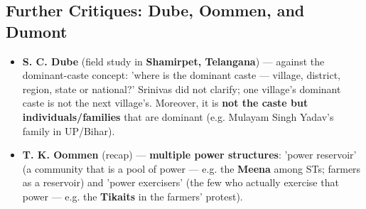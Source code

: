 \subsection{Further Critiques: Dube, Oommen, and Dumont}

\begin{CriticalPoint}
\begin{itemize}
\item \textbf{S. C. Dube} (field study in \textbf{Shamirpet, Telangana}) --- against the dominant-caste concept: 'where is the dominant caste --- village, district, region, state or national?' Srinivas did not clarify; one village's dominant caste is not the next village's. Moreover, it is \textbf{not the caste but individuals/families} that are dominant (e.g. Mulayam Singh Yadav's family in UP/Bihar).
\item \textbf{T. K. Oommen} (recap) --- \textbf{multiple power structures}: 'power reservoir' (a community that is a pool of power --- e.g. the \textbf{Meena} among STs; farmers as a reservoir) and 'power exercisers' (the few who actually exercise that power --- e.g. the \textbf{Tikaits} in the farmers' protest).
\end{itemize}
\end{CriticalPoint}

